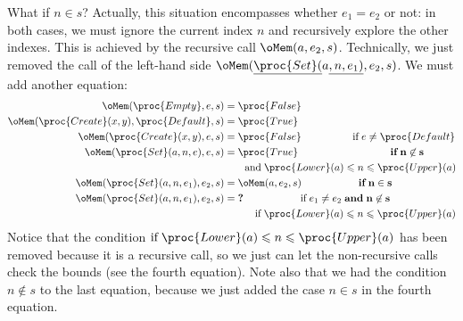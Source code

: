 \begin{itemize}
    What if \(n \in s\)? Actually, this situation encompasses whether
    \(e_1 = e_2\) or not: in both cases, we must ignore the current
    index \(n\) and recursively explore the other indexes. This is
    achieved by the recursive call \(\oMem (a, e_2, s)\). Technically,
    we just removed the  call of the left-hand side \(\oMem
    (\underline{\proc{Set} (}a\underline{, n, e_1)}, e_2, s)\). We
    must add another equation:
    \begin{align*}
        \oMem (\proc{Empty}, e, s)
     &= \proc{False}\\
        \oMem (\proc{Create} (x, y), \proc{Default}, s)
     &= \proc{True}\\
        \oMem (\proc{Create} (x, y), e, s)
     &= \proc{False}
        \qquad\qquad\quad \text{if} \; e \neq \proc{Default}\\
        \oMem (\proc{Set} (a, n, e), e, s)
     &= \proc{True}
       \qquad\qquad\qquad\qquad\quad \textbf{if} \; \mathbf{n \not\in s}\\
     & \qquad \text{and} \; \proc{Lower} (a)
        \leqslant n \leqslant \proc{Upper} (a)\\
        \oMem (\proc{Set} (a, n, e_1), e_2, s)
     &= \oMem (a, e_2, s)
        \qquad\qquad\quad \;\; \textbf{if} \; \mathbf{n \in s}\\
        \oMem (\proc{Set} (a, n, e_1), e_2, s)
     &= \textbf{?}
      \qquad\qquad\quad \;\; \text{if} \; e_1 \neq e_2 \; \textbf{and}
      \; \mathbf{n \not\in s}\\
     & \qquad\quad \text{if} \; \proc{Lower}
     (a) \leqslant n \leqslant \proc{Upper} (a)
    \end{align*}
    Notice that the condition \(\text{if} \; \proc{Lower} (a)
    \leqslant n \leqslant \proc{Upper} (a)\) has been removed because
    it is a recursive call, so we just can let the non-recursive calls
    check the bounds (see the fourth equation). Note also that we had
    the condition \(n \not\in s\) to the last equation, because we
    just added the case \(n \in s\) in the fourth equation.


\end{itemize}
